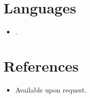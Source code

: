 \documentclass[11pt,a4paper,sans]{moderncv}
\begin{document}

\section{Languages}
\vspace{1pt}
\begin{itemize}
\item [English (fluent); add others].
\end{itemize}


\section{References}
\vspace{1pt}
\begin{itemize}
\item{Available upon request.}
\end{itemize}
\end{document}
